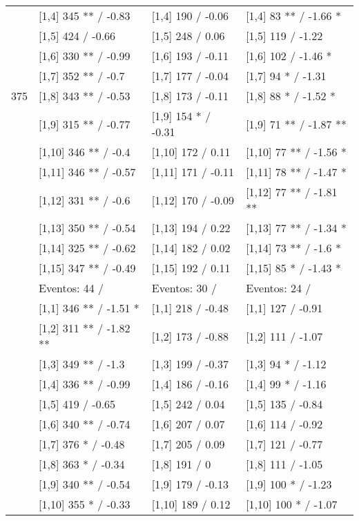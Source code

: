 \begin{table}
\begin{tabular}[t]{llll}
\addlinespace
 & {}[1,4] 345 ** / -0.83 & {}[1,4] 190  / -0.06 & {}[1,4] 83 ** / -1.66 *\\
 & {}[1,5] 424  / -0.66 & {}[1,5] 248  / 0.06 & {}[1,5] 119  / -1.22\\
 & {}[1,6] 330 ** / -0.99 & {}[1,6] 193  / -0.11 & {}[1,6] 102  / -1.46 *\\
 & {}[1,7] 352 ** / -0.7 & {}[1,7] 177  / -0.04 & {}[1,7] 94 * / -1.31\\
375 & {}[1,8] 343 ** / -0.53 & {}[1,8] 173  / -0.11 & {}[1,8] 88 * / -1.52 *\\
\addlinespace
 & {}[1,9] 315 ** / -0.77 & {}[1,9] 154 * / -0.31 & {}[1,9] 71 ** / -1.87 **\\
 & {}[1,10] 346 ** / -0.4 & {}[1,10] 172  / 0.11 & {}[1,10] 77 ** / -1.56 *\\
 & {}[1,11] 346 ** / -0.57 & {}[1,11] 171  / -0.11 & {}[1,11] 78 ** / -1.47 *\\
 & {}[1,12] 331 ** / -0.6 & {}[1,12] 170  / -0.09 & {}[1,12] 77 ** / -1.81 **\\
 & {}[1,13] 350 ** / -0.54 & {}[1,13] 194  / 0.22 & {}[1,13] 77 ** / -1.34 *\\
\addlinespace
 & {}[1,14] 325 ** / -0.62 & {}[1,14] 182  / 0.02 & {}[1,14] 73 ** / -1.6 *\\
 & {}[1,15] 347 ** / -0.49 & {}[1,15] 192  / 0.11 & {}[1,15] 85 * / -1.43 *\\
 & Eventos:  44 / & Eventos:  30 / & Eventos:  24 /\\
 & {}[1,1] 346 ** / -1.51 * & {}[1,1] 218  / -0.48 & {}[1,1] 127  / -0.91\\
 & {}[1,2] 311 ** / -1.82 ** & {}[1,2] 173  / -0.88 & {}[1,2] 111  / -1.07\\
\addlinespace
 & {}[1,3] 349 ** / -1.3 & {}[1,3] 199  / -0.37 & {}[1,3] 94 * / -1.12\\
 & {}[1,4] 336 ** / -0.99 & {}[1,4] 186  / -0.16 & {}[1,4] 99 * / -1.16\\
 & {}[1,5] 419  / -0.65 & {}[1,5] 242  / 0.04 & {}[1,5] 135  / -0.84\\
 & {}[1,6] 340 ** / -0.74 & {}[1,6] 207  / 0.07 & {}[1,6] 114  / -0.92\\
 & {}[1,7] 376 * / -0.48 & {}[1,7] 205  / 0.09 & {}[1,7] 121  / -0.77\\
\addlinespace
500 & {}[1,8] 363 * / -0.34 & {}[1,8] 191  / 0 & {}[1,8] 111  / -1.05\\
 & {}[1,9] 340 ** / -0.54 & {}[1,9] 179  / -0.13 & {}[1,9] 100 * / -1.23\\
 & {}[1,10] 355 * / -0.33 & {}[1,10] 189  / 0.12 & {}[1,10] 100 * / -1.07\\

\end{tabular}
\end{table}
